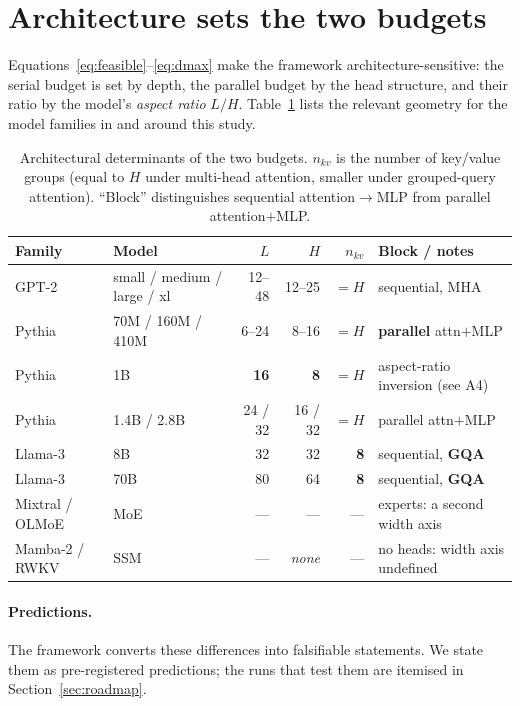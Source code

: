 \documentclass[11pt]{article}
\begin{document}
\section{Architecture sets the two budgets}\label{sec:arch}
Equations~\eqref{eq:feasible}--\eqref{eq:dmax} make the framework
architecture-sensitive: the serial budget is set by depth, the parallel budget
by the head structure, and their ratio by the model's \emph{aspect ratio}
$L/H$. Table~\ref{tab:arch} lists the relevant geometry for the model families
in and around this study.

\begin{table}[h]
\centering
\caption{Architectural determinants of the two budgets. $n_{kv}$ is the number
of key/value groups (equal to $H$ under multi-head attention, smaller under
grouped-query attention). ``Block'' distinguishes sequential attention$\to$MLP
from parallel attention$+$MLP.}
\label{tab:arch}
\small
\begin{tabular}{llrrrl}
\toprule
Family & Model & $L$ & $H$ & $n_{kv}$ & Block / notes \\
\midrule
GPT-2 & small / medium / large / xl & 12--48 & 12--25 & $=H$ & sequential, MHA \\
Pythia & 70M / 160M / 410M & 6--24 & 8--16 & $=H$ & \textbf{parallel} attn$+$MLP \\
Pythia & 1B & \textbf{16} & \textbf{8} & $=H$ & aspect-ratio inversion (see A4) \\
Pythia & 1.4B / 2.8B & 24 / 32 & 16 / 32 & $=H$ & parallel attn$+$MLP \\
Llama-3 & 8B & 32 & 32 & \textbf{8} & sequential, \textbf{GQA} \\
Llama-3 & 70B & 80 & 64 & \textbf{8} & sequential, \textbf{GQA} \\
Mixtral / OLMoE & MoE & --- & --- & --- & experts: a second width axis \\
Mamba-2 / RWKV & SSM & --- & \emph{none} & --- & no heads: width axis undefined \\
\bottomrule
\end{tabular}
\end{table}

\paragraph{Predictions.}
The framework converts these differences into falsifiable statements. We state
them as pre-registered predictions; the runs that test them are itemised in
Section~\ref{sec:roadmap}.
\end{document}
